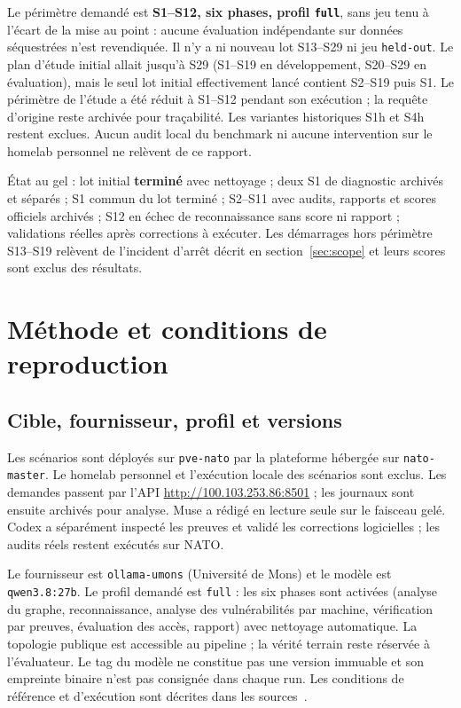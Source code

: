 \documentclass[11pt,a4paper]{article}
\newcommand{\code}[1]{{\urlstyle{tt}\nolinkurl{#1}}}
\begin{document}
Le p\'erim\`etre demand\'e est \textbf{S1--S12, six phases, profil \code{full}}, sans jeu tenu \`a l'\'ecart de la mise au point : aucune \'evaluation ind\'ependante sur donn\'ees s\'equestr\'ees n'est revendiqu\'ee. Il n'y a ni nouveau lot S13--S29 ni jeu \code{held-out}. Le plan d'étude initial allait jusqu'à S29 (S1--S19 en développement, S20--S29 en évaluation), mais le seul lot initial effectivement lancé contient S2--S19 puis S1. Le périmètre de l'étude a été réduit à S1--S12 pendant son exécution ; la requ\^ete d'origine reste archiv\'ee pour tra\c{c}abilit\'e. Les variantes historiques S1h et S4h restent exclues. Aucun audit local du benchmark ni aucune intervention sur le homelab personnel ne rel\`event de ce rapport.

\'Etat au gel : lot initial \textbf{termin\'e} avec nettoyage ; deux S1 de diagnostic archiv\'es et s\'epar\'es ; S1 commun du lot termin\'e ; S2--S11 avec audits, rapports et scores officiels archiv\'es ; S12 en \'echec de reconnaissance sans score ni rapport ; validations r\'eelles apr\`es corrections \`a ex\'ecuter. Les d\'emarrages hors p\'erim\`etre S13--S19 rel\`event de l'incident d'arr\^et d\'ecrit en section~\ref{sec:scope} et leurs scores sont exclus des r\'esultats.

\section{M\'ethode et conditions de reproduction}
\label{sec:methode}
\subsection{Cible, fournisseur, profil et versions}
Les sc\'enarios sont d\'eploy\'es sur \code{pve-nato} par la plateforme h\'eberg\'ee sur \code{nato-master}. Le homelab personnel et l'ex\'ecution locale des sc\'enarios sont exclus. Les demandes passent par l'API \url{http://100.103.253.86:8501} ; les journaux sont ensuite archivés pour analyse. Muse a rédigé en lecture seule sur le faisceau gelé. Codex a séparément inspecté les preuves et validé les corrections logicielles ; les audits réels restent exécutés sur NATO.

Le fournisseur est \code{ollama-umons} (Universit\'e de Mons) et le mod\`ele est \code{qwen3.8:27b}. Le profil demand\'e est \code{full} : les six phases sont activ\'ees (analyse du graphe, reconnaissance, analyse des vuln\'erabilit\'es par machine, v\'erification par preuves, \'evaluation des acc\`es, rapport) avec nettoyage automatique. La topologie publique est accessible au pipeline ; la v\'erit\'e terrain reste r\'eserv\'ee \`a l'\'evaluateur. Le tag du mod\`ele ne constitue pas une version immuable et son empreinte binaire n'est pas consign\'ee dans chaque run. Les conditions de r\'ef\'erence et d'ex\'ecution sont d\'ecrites dans les sources~\cite{catalogue,contrat}.
\end{document}
